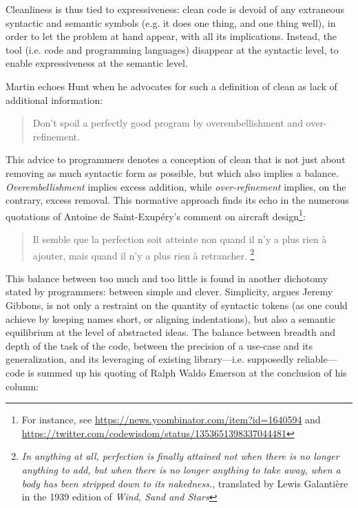 Cleanliness is thus tied to expressiveness: clean code is devoid of any extraneous syntactic and semantic symbols (e.g. it does one thing, and one thing well), in order to let the problem at hand appear, with all its implications. Instead, the tool (i.e. code and programming languages) disappear at the syntactic level, to enable expressiveness at the semantic level.

Martin echoes Hunt when he advocates for such a definition of clean as lack of additional information:

\begin{quote}
  Don't spoil a perfectly good program by overembellishment and over-refinement.\cite{hunt_pragmatic_1999}
\end{quote}

This advice to programmers denotes a conception of clean that is not just about removing as much syntactic form as possible, but which also implies a balance. \emph{Overembellishment} implies excess addition, while \emph{over-refinement} implies, on the contrary, excess removal. This normative approach finds its echo in the numerous quotations of Antoine de Saint-Exupéry's comment on aircraft design\footnote{For instance, see \url{https://news.ycombinator.com/item?id=1640594} and \url{https://twitter.com/codewisdom/status/1353651398337044481}}:

\begin{quote}
  Il semble que la perfection soit atteinte non quand il n'y a plus rien à ajouter, mais quand il n'y a plus rien à retrancher. \cite{desaint-exupery_terre_1972}\footnote{\emph{ In anything at all, perfection is finally attained not when there is no longer anything to add, but when there is no longer anything to take away, when a body has been stripped down to its nakedness.}, translated by Lewis Galantière in the 1939 edition of \emph{Wind, Sand and Stars}}
\end{quote}

This balance between too much and too little is found in another dichotomy stated by programmers: between simple and clever. Simplicity, argues Jeremy Gibbons, is not only a restraint on the quantity of syntactic tokens (as one could achieve by keeping names short, or aligning indentations), but also a semantic equilibrium at the level of abstracted ideas\cite{gibbons_beauty_2012}. The balance between breadth and depth of the task of the code, between the precision of a use-case and its generalization, and its leveraging of existing library—i.e. supposedly reliable—code is summed up his quoting of Ralph Waldo Emerson at the conclusion of his column:


